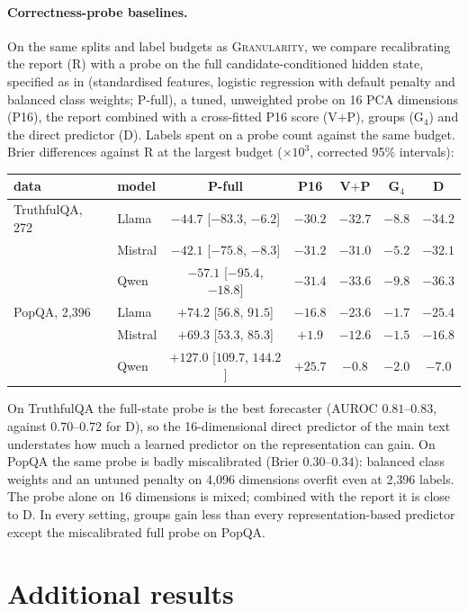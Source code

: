 \documentclass[11pt]{article}
\theoremstyle{definition}
\theoremstyle{remark}
\newcommand{\1}{\mathbf{1}}
\newcommand{\expname}[1]{\textsc{#1}}
\begin{document}
\paragraph{Correctness-probe baselines.} On the same splits and label budgets as \expname{Granularity}, we compare
recalibrating the report (R) with a probe on the full candidate-conditioned hidden state, specified as in
\citet{moreno2025correctness} (standardised features, logistic regression with default penalty and balanced class
weights; P-full), a tuned, unweighted probe on 16 PCA dimensions (P16), the report combined with a cross-fitted P16
score (V$+$P), groups (G$_4$) and the direct predictor (D). Labels spent on a probe count against the same budget.
Brier differences against R at the largest budget ($\times10^3$, corrected 95\% intervals):
\begin{center}\small
\begin{tabular}{llccccc}
\toprule
data & model & P-full & P16 & V$+$P & G$_4$ & D\\
\midrule
TruthfulQA, 272 & Llama & $-44.7$ [$-83.3$, $-6.2$] & $-30.2$ & $-32.7$ & $-8.8$ & $-34.2$\\
 & Mistral & $-42.1$ [$-75.8$, $-8.3$] & $-31.2$ & $-31.0$ & $-5.2$ & $-32.1$\\
 & Qwen & $-57.1$ [$-95.4$, $-18.8$] & $-31.4$ & $-33.6$ & $-9.8$ & $-36.3$\\
PopQA, 2{,}396 & Llama & $+74.2$ [$56.8$, $91.5$] & $-16.8$ & $-23.6$ & $-1.7$ & $-25.4$\\
 & Mistral & $+69.3$ [$53.3$, $85.3$] & $+1.9$ & $-12.6$ & $-1.5$ & $-16.8$\\
 & Qwen & $+127.0$ [$109.7$, $144.2$] & $+25.7$ & $-0.8$ & $-2.0$ & $-7.0$\\
\bottomrule
\end{tabular}
\end{center}
On TruthfulQA the full-state probe is the best forecaster (AUROC $0.81$--$0.83$, against $0.70$--$0.72$ for D), so
the 16-dimensional direct predictor of the main text understates how much a learned predictor on the
representation can gain. On PopQA the same probe is badly miscalibrated (Brier $0.30$--$0.34$): balanced class
weights and an untuned penalty on 4{,}096 dimensions overfit even at 2{,}396 labels. The probe alone on 16
dimensions is mixed; combined with the report it is close to D. In every setting, groups gain less than every
representation-based predictor except the miscalibrated full probe on PopQA.

\section{Additional results}
\label{app:extra}
\end{document}
